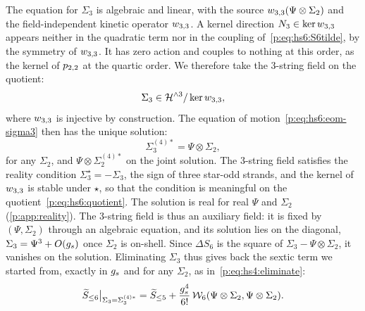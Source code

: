 The equation for $\Sigma_3$ is algebraic and linear, with the source $\wprod{3}{3}(\Psi \otimes \Sigma_2)$ and the field-independent kinetic operator $\wprod{3}{3}$.
A kernel direction $N_3 \in \ker \wprod{3}{3}$ appears neither in the quadratic term nor in the coupling of~\eqref{p:eq:hs6:S6tilde}, by the symmetry of $\wprod{3}{3}$.
It has zero action and couples to nothing at this order, as the kernel of $\sprod{2}{2}$ at the quartic order.
We therefore take the $3$-string field on the quotient:
\begin{equation}
  \label{p:eq:hs6:quotient}
  \Sigma_3
    \in \Hn{3} / \ker \wprod{3}{3},
\end{equation}
where $\wprod{3}{3}$ is injective by construction.
The equation of motion~\eqref{p:eq:hs6:eom-sigma3} then has the unique solution:
\begin{equation}
  \label{p:eq:hs6:saddle-sigma3}
  \Sigma_3^{(4)*}
    = \Psi \otimes \Sigma_2,
\end{equation}
for any $\Sigma_2$, and $\Psi \otimes \Sigma_2^{(4)*}$ on the joint solution.
The $3$-string field satisfies the reality condition $\Sigma_3^\star = - \Sigma_3$, the sign of three star-odd strands, and the kernel of $\wprod{3}{3}$ is stable under $\star$, so that the condition is meaningful on the quotient~\eqref{p:eq:hs6:quotient}.
The solution is real for real $\Psi$ and $\Sigma_2$ (\cref{p:app:reality}).
The $3$-string field is thus an auxiliary field: it is fixed by $(\Psi, \Sigma_2)$ through an algebraic equation, and its solution lies on the diagonal, $\Sigma_3 = \Psi^3 + O(\gs)$ once $\Sigma_2$ is on-shell.
Since $\Delta S_6$ is the square of $\Sigma_3 - \Psi \otimes \Sigma_2$, it vanishes on the solution.
Eliminating $\Sigma_3$ thus gives back the sextic term we started from, exactly in $\gs$ and for any $\Sigma_2$, as in~\eqref{p:eq:hs4:eliminate}:
\begin{equation}
  \label{p:eq:hs6:eliminate-sigma3}
  \caction[\le 6] \big|_{\Sigma_3 = \Sigma_3^{(4)*}}
    = \caction[\le 5] + \frac{\gs^4}{6!} \, \dvertex{6}(\Psi \otimes \Sigma_2, \Psi \otimes \Sigma_2).
\end{equation}

